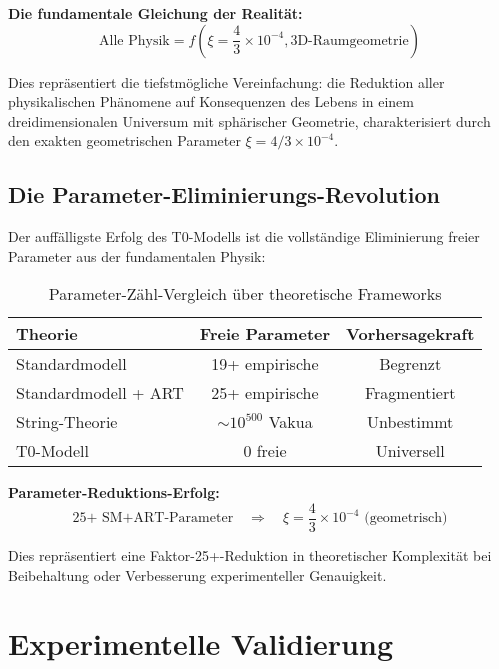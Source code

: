 \documentclass[12pt,a4paper]{report}
\begin{document}
	\textbf{Die fundamentale Gleichung der Realität:}
	\begin{equation}
		\boxed{\text{Alle Physik} = f\left(\xi = \frac{4}{3} \times 10^{-4}, \text{3D-Raumgeometrie}\right)}
	\end{equation}
	
	Dies repräsentiert die tiefstmögliche Vereinfachung: die Reduktion aller physikalischen Phänomene auf Konsequenzen des Lebens in einem dreidimensionalen Universum mit sphärischer Geometrie, charakterisiert durch den exakten geometrischen Parameter $\xi = 4/3 \times 10^{-4}$.
	
	\subsection{Die Parameter-Eliminierungs-Revolution}
	\label{subsec:parameter_elimination}
	
	Der auffälligste Erfolg des T0-Modells ist die vollständige Eliminierung freier Parameter aus der fundamentalen Physik:
	
	\begin{table}[htbp]
		\centering
		\begin{tabular}{lcc}
			\toprule
			\textbf{Theorie} & \textbf{Freie Parameter} & \textbf{Vorhersagekraft} \\
			\midrule
			Standardmodell & 19+ empirische & Begrenzt \\
			Standardmodell + ART & 25+ empirische & Fragmentiert \\
			String-Theorie & $\sim 10^{500}$ Vakua & Unbestimmt \\
			T0-Modell & 0 freie & Universell \\
			\bottomrule
		\end{tabular}
		\caption{Parameter-Zähl-Vergleich über theoretische Frameworks}
		\label{tab:parameter_comparison}
	\end{table}
	
	\textbf{Parameter-Reduktions-Erfolg:}
	\begin{equation}
		\text{25+ SM+ART-Parameter} \quad \Rightarrow \quad \xi = \frac{4}{3} \times 10^{-4} \text{ (geometrisch)}
	\end{equation}
	
	Dies repräsentiert eine Faktor-25+-Reduktion in theoretischer Komplexität bei Beibehaltung oder Verbesserung experimenteller Genauigkeit.
	
	\section{Experimentelle Validierung}
	\label{sec:experimental_validation}
	
\end{document}
